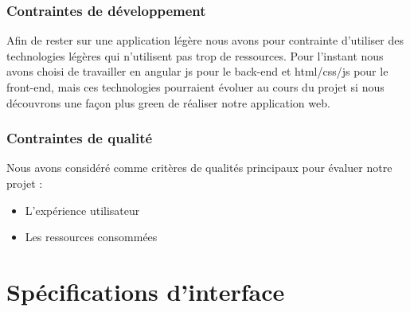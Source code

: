 \documentclass[11pt,a4paper]{report}
\begin{document}
			\subsection{Contraintes de développement}
				Afin de rester sur une application légère nous avons pour contrainte d’utiliser des technologies légères qui n’utilisent pas trop de ressources. Pour l’instant nous avons choisi de travailler en angular js pour le back-end et html/css/js pour le front-end, mais ces technologies pourraient évoluer au cours du projet si nous découvrons une façon plus green de réaliser notre application web.	
			\subsection{Contraintes de qualité}  
				Nous avons considéré comme critères de qualités principaux pour évaluer notre projet :
				
				\begin{itemize}
            		\item L’expérience utilisateur
            		\item Les ressources consommées
				\end{itemize}
				
	\chapter{Spécifications d'interface}
\end{document}
